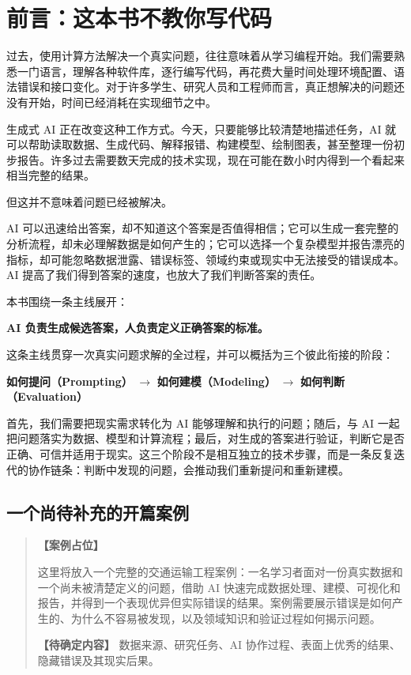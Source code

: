 \chapter*{前言：这本书不教你写代码}

过去，使用计算方法解决一个真实问题，往往意味着从学习编程开始。我们需要熟悉一门语言，理解各种软件库，逐行编写代码，再花费大量时间处理环境配置、语法错误和接口变化。对于许多学生、研究人员和工程师而言，真正想解决的问题还没有开始，时间已经消耗在实现细节之中。

生成式 AI 正在改变这种工作方式。今天，只要能够比较清楚地描述任务，AI 就可以帮助读取数据、生成代码、解释报错、构建模型、绘制图表，甚至整理一份初步报告。许多过去需要数天完成的技术实现，现在可能在数小时内得到一个看起来相当完整的结果。

但这并不意味着问题已经被解决。

AI 可以迅速给出答案，却不知道这个答案是否值得相信；它可以生成一套完整的分析流程，却未必理解数据是如何产生的；它可以选择一个复杂模型并报告漂亮的指标，却可能忽略数据泄露、错误标签、领域约束或现实中无法接受的错误成本。AI 提高了我们得到答案的速度，也放大了我们判断答案的责任。

本书围绕一条主线展开：

\begin{center}
\textbf{AI 负责生成候选答案，人负责定义正确答案的标准。}
\end{center}

这条主线贯穿一次真实问题求解的全过程，并可以概括为三个彼此衔接的阶段：

\begin{center}
\textbf{如何提问（Prompting）}
$\longrightarrow$
\textbf{如何建模（Modeling）}
$\longrightarrow$
\textbf{如何判断（Evaluation）}
\end{center}

首先，我们需要把现实需求转化为 AI 能够理解和执行的问题；随后，与 AI 一起把问题落实为数据、模型和计算流程；最后，对生成的答案进行验证，判断它是否正确、可信并适用于现实。这三个阶段不是相互独立的技术步骤，而是一条反复迭代的协作链条：判断中发现的问题，会推动我们重新提问和重新建模。

\section*{一个尚待补充的开篇案例}

\begin{quote}
\textbf{【案例占位】}

这里将放入一个完整的交通运输工程案例：一名学习者面对一份真实数据和一个尚未被清楚定义的问题，借助 AI 快速完成数据处理、建模、可视化和报告，并得到一个表现优异但实际错误的结果。案例需要展示错误是如何产生的、为什么不容易被发现，以及领域知识和验证过程如何揭示问题。

\textbf{【待确定内容】} 数据来源、研究任务、AI 协作过程、表面上优秀的结果、隐藏错误及其现实后果。
\end{quote}

